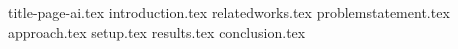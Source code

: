\documentclass[a4paper,12pt]{article}
\begin{document}
{title-page-ai.tex}
\tableofcontents
\linenumbers
{introduction.tex}
{relatedworks.tex}
{problemstatement.tex}
{approach.tex}
{setup.tex}
{results.tex}
{conclusion.tex}

\printbibliography
\end{document}
